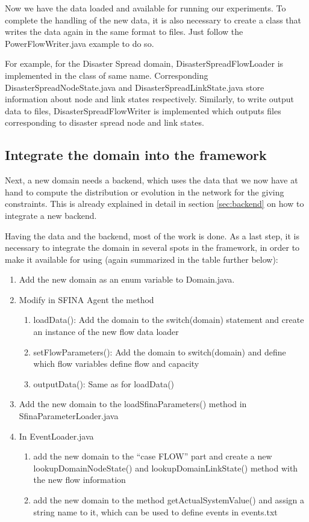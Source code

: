 \documentclass[11pt,fleqn]{book} %
\begin{document}
Now we have the data loaded and available for running our experiments. To complete the handling of the new data, it is also necessary to create a class that writes the data again in the same format to files. Just follow the PowerFlowWriter.java example to do so.

For example, for the Disaster Spread domain, DisasterSpreadFlowLoader is implemented in the class of same name. Corresponding DisasterSpreadNodeState.java and DisasterSpreadLinkState.java store information about node and link states respectively.
Similarly, to write output data to files, DisasterSpreadFlowWriter is implemented which outputs files corresponding to disaster spread node and link states.

\subsection{Integrate the domain into the framework}
Next, a new domain needs a backend, which uses the data that we now have at hand to compute the distribution or evolution in the network for the giving constraints. This is already explained in detail in section \ref{sec:backend} on how to integrate a new backend.

Having the data and the backend, most of the work is done. As a last step, it is necessary to integrate the domain in several spots in the framework, in order to make it available for using (again summarized in the table further below):
\begin{enumerate}
	\item Add the new domain as an enum variable to Domain.java.
	\item Modify in SFINA Agent the method
	\begin{enumerate}
		\item loadData(): Add the domain to the switch(domain) statement and create an instance of the new flow data loader
		\item setFlowParameters(): Add the domain to switch(domain) and define which flow variables define flow and capacity
		\item outputData(): Same as for loadData()
	\end{enumerate}
	\item Add the new domain to the loadSfinaParameters() method in SfinaParameterLoader.java
	\item In EventLoader.java 
	\begin{enumerate}
		\item add the new domain to the “case FLOW” part and create a new lookupDomainNodeState() and lookupDomainLinkState() method with the new flow information
		\item add the new domain to the method getActualSystemValue() and assign a string name to it, which can be used to define events in events.txt
		\end{enumerate}
\end{enumerate}
\end{document}
